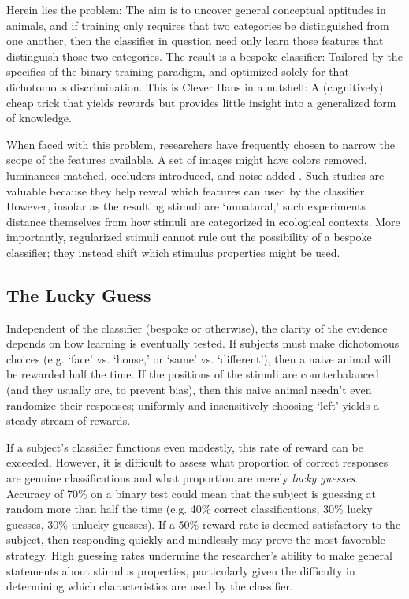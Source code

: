 \documentclass{frontiersSCNS} %
\begin{document}
Herein lies the problem: The aim is to uncover general conceptual aptitudes in animals, and if training only requires that two categories be distinguished from one another, then the classifier in question need only learn those features that distinguish those two categories. The result is a bespoke classifier: Tailored by the specifics of the binary training paradigm, and optimized solely for that dichotomous discrimination. This is Clever Hans in a nutshell: A (cognitively) cheap trick that yields rewards but provides little insight into a generalized form of knowledge.

When faced with this problem, researchers have frequently chosen to narrow the scope of the features available. A set of images might have colors removed, luminances matched, occluders introduced, and noise added \citep[e.g.][]{Basi2013}. Such studies are valuable because they help reveal which features can used by the classifier. However, insofar as the resulting stimuli are `unnatural,' such experiments distance themselves from how stimuli are categorized in ecological contexts. More importantly, regularized stimuli cannot rule out the possibility of a bespoke classifier; they instead shift which stimulus properties might be used.

\subsection{The Lucky Guess}

Independent of the classifier (bespoke or otherwise), the clarity of the evidence depends on how learning is eventually tested. If subjects must make dichotomous choices (e.g. `face' vs. `house,' or `same' vs. `different'), then a naive animal will be rewarded half the time. If the positions of the stimuli are counterbalanced (and they usually are, to prevent bias), then this naive animal needn't even randomize their responses; uniformly and insensitively choosing `left' yields a steady stream of rewards.

If a subject's classifier functions even modestly, this rate of reward can be exceeded. However, it is difficult to assess what proportion of correct responses are genuine classifications and what proportion are merely \textsl{lucky guesses}. Accuracy of 70\% on a binary test could mean that the subject is guessing at random more than half the time (e.g. 40\% correct classifications, 30\% lucky guesses, 30\% unlucky guesses). If a 50\% reward rate is deemed satisfactory to the subject, then responding quickly and mindlessly may prove the most favorable strategy. High guessing rates undermine the researcher's ability to make general statements about stimulus properties, particularly given the difficulty in determining which characteristics are used by the classifier.
\end{document}
